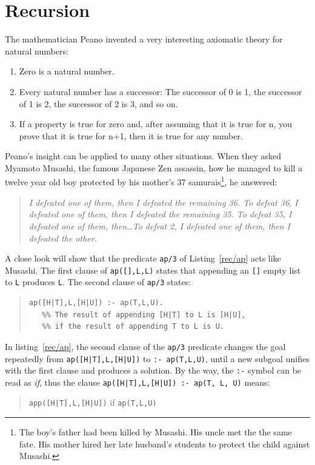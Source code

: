 \documentclass[a4paper,12pt]{book}
\begin{document}
\chapter{Recursion}\label{chapter:Recursion}
The mathematician Peano invented a very interesting axiomatic theory for
natural numbers:
\begin{enumerate}
\item Zero is a natural number.
\item Every natural number has a successor: The successor
      of 0 is 1, the successor of 1 is 2, the successor
      of 2 is 3, and so on.
\item If a property is true for zero and, after assuming
	that it is true for n, you prove that it is true
	for n+1, then it is true for any number.
\end{enumerate}
Peano's insight can be applied to many other situations.
When they asked Myamoto Musashi, the famous Japanese Zen
assassin, how he managed to kill a twelve year old boy
protected by his mother's 37 samurais\footnote{The boy's
father had been killed by Musashi. His uncle met the the
same fate. His mother hired her late husband's students
to protect the child against Musashi.}, he answered:
\begin{quote}\em
I defeated one of them, then I defeated the remaining 36.
To defeat 36, I defeated one of them, then I defeated
the remaining 35. To defeat 35, I defeated one of them,
then\ldots To defeat 2, I defeated one of them, then
I defeated the other.
\end{quote}
A close look will show that the predicate \verb|ap/3|
 of
Listing~\ref{rec/ap} acts like Musashi. The first
clause of \verb|ap([],L,L)| states that appending
an \verb|[]| empty list to \verb|L| produces \verb|L|.
The second  clause of \verb|ap/3|  states:
\begin{quote}
\begin{verbatim}
ap([H|T],L,[H|U]) :- ap(T,L,U).
   %% The result of appending [H|T] to L is [H|U],
   %% if the result of appending T to L is U.
\end{verbatim}
\end{quote}

In listing~\ref{rec/ap}, the second clause of the \verb|ap/3|
predicate changes the goal repeatedly from
\verb/ap([H|T],L,[H|U])/ to \verb/:- ap(T,L,U)/, until a new
subgoal unifies with the first clause and produces a solution.
By the way, the \verb|:-| symbol can be read as {\em if},
thus the clause \verb/ap([H|T],L,[H|U]) :- ap(T, L, U)/ means:
\begin{quote}
\verb/app([H|T],L,[H|U])/ if \verb/ap(T,L,U)/
\end{quote}
\end{document}
